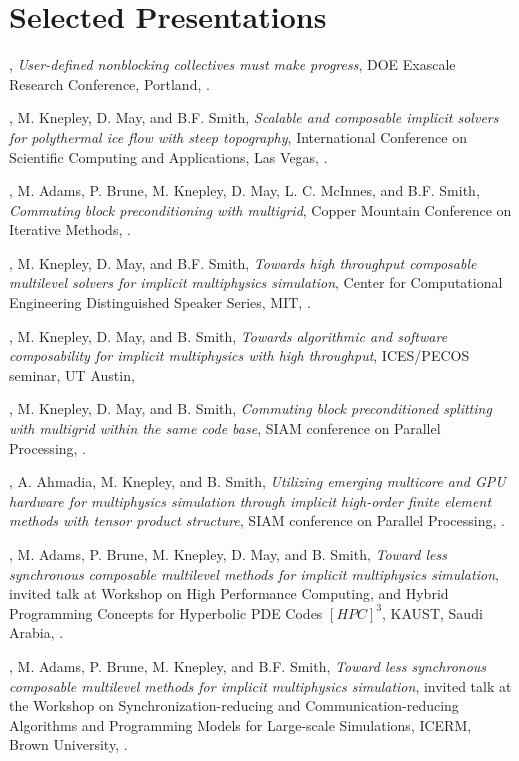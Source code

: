 \documentclass[10pt,letterpaper]{article}
\newcommand\ptitle[1]{\textit{#1}} %
\renewenvironment{itemize}{
  \begin{list}{}{
    \setlength{\leftmargin}{1.5em}
    \setlength{\itemsep}{0.25em}
    \setlength{\parskip}{0pt}
    \setlength{\parsep}{0.25em}
  }
}{
  \end{list}
}
\begin{document}
\section*{Selected Presentations}
\begin{itemize}
\item {\JedBrown}, \ptitle{User-defined nonblocking collectives must make progress}, DOE Exascale Research Conference, Portland, .
\item {\JedBrown}, M. Knepley, D. May, and B.F. Smith, \ptitle{Scalable and composable implicit solvers for polythermal ice flow with steep topography}, International Conference on Scientific Computing and Applications, Las Vegas, .
\item {\JedBrown}, M. Adams, P. Brune, M. Knepley, D. May, L. C. McInnes, and B.F. Smith, \ptitle{Commuting block preconditioning with multigrid}, Copper Mountain Conference on Iterative Methods, .
\item {\JedBrown}, M. Knepley, D. May, and B.F. Smith, \ptitle{Towards high throughput composable multilevel solvers for implicit multiphysics simulation}, Center for Computational Engineering Distinguished Speaker Series, MIT, .
\item {\JedBrown}, M. Knepley, D. May, and B. Smith, \ptitle{Towards algorithmic and software composability for implicit multiphysics with high throughput}, ICES/PECOS seminar, UT Austin, 
\item {\JedBrown}, M. Knepley, D. May, and B. Smith, \ptitle{Commuting block preconditioned splitting with multigrid within the same code base}, SIAM conference on Parallel Processing, .
\item {\JedBrown}, A. Ahmadia, M. Knepley, and B. Smith, \ptitle{Utilizing emerging multicore and GPU hardware for multiphysics simulation through implicit high-order finite element methods with tensor product structure}, SIAM conference on Parallel Processing, .
\item {\JedBrown}, M. Adams, P. Brune, M. Knepley, D. May, and B. Smith, \ptitle{Toward less synchronous composable multilevel methods for implicit multiphysics simulation}, invited talk at Workshop on High Performance Computing, and Hybrid Programming Concepts for Hyperbolic PDE Codes $[HPC]^3$, KAUST, Saudi Arabia, .
\item {\JedBrown}, M. Adams, P. Brune, M. Knepley, and B.F. Smith, \ptitle{Toward less synchronous composable multilevel methods for implicit multiphysics simulation}, invited talk at the Workshop on Synchronization-reducing and Communication-reducing Algorithms and Programming Models for Large-scale Simulations, ICERM, Brown University, .

\end{itemize}
\end{document}

